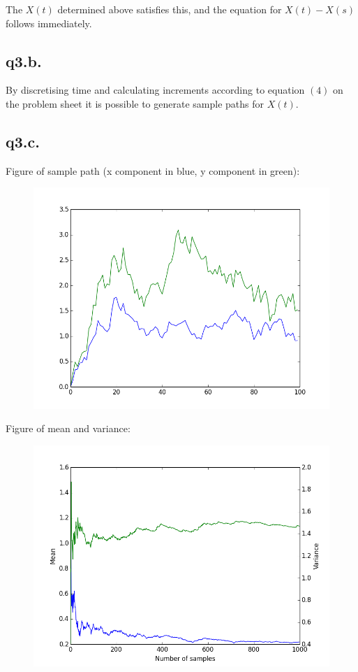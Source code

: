 \documentclass[11pt]{article} %
\begin{document}
The $X(t)$ determined above satisfies this, and the equation for $X(t) - X(s)$ follows immediately.

\subsection{q3.b.}
By discretising time and calculating increments according to equation $(4)$ on the problem sheet it is possible to generate sample paths for $X(t)$.

\subsection{q3.c.}
Figure of sample path (x component in blue, y component in green):

\begin{figure}
	\centering
		\includegraphics[scale = 0.5]{q3c.png}
\end{figure}

Figure of mean and variance:
\begin{figure}[h!]
	\centering
		\includegraphics[scale = 0.5]{q3c2.png}
\end{figure}
\end{document}
